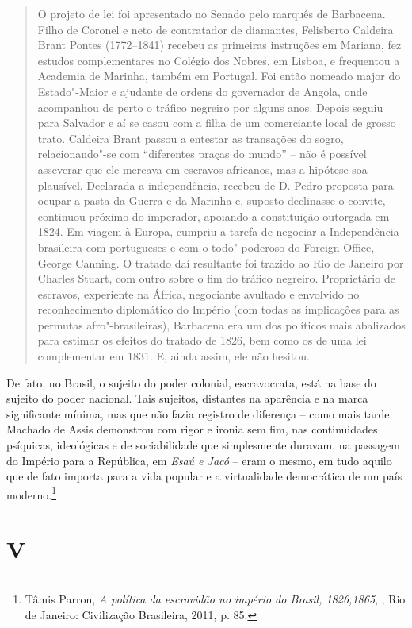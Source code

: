 \begin{quote}
O projeto de lei foi apresentado no Senado pelo marquês de Barbacena.
Filho de Coronel e neto de contratador de diamantes, Felisberto Caldeira
Brant Pontes (1772--1841) recebeu as primeiras instruções em Mariana, fez
estudos complementares no Colégio dos Nobres, em Lisboa, e frequentou a
Academia de Marinha, também em Portugal. Foi então nomeado major do
Estado"-Maior e ajudante de ordens do governador de Angola, onde
acompanhou de perto o tráfico negreiro por alguns anos. Depois seguiu
para Salvador e aí se casou com a filha de um comerciante local de
grosso trato. Caldeira Brant passou a entestar as transações do sogro,
relacionando"-se com ``diferentes praças do mundo'' -- não é possível
asseverar que ele mercava em escravos africanos, mas a hipótese soa
plausível. Declarada a independência, recebeu de D. Pedro  proposta
para ocupar a pasta da Guerra e da Marinha e, suposto declinasse o
convite, continuou próximo do imperador, apoiando a constituição
outorgada em 1824. Em viagem à Europa, cumpriu a tarefa de negociar a
Independência brasileira com portugueses e com o todo"-poderoso do
Foreign Office, George Canning. O tratado daí resultante foi trazido ao
Rio de Janeiro por Charles Stuart, com outro sobre o fim do tráfico
negreiro. Proprietário de escravos, experiente na África, negociante
avultado e envolvido no reconhecimento diplomático do Império (com todas
as implicações para as permutas afro"-brasileiras), Barbacena era um dos
políticos mais abalizados para estimar os efeitos do tratado de 1826,
bem como os de uma lei complementar em 1831. E, ainda assim, ele não
hesitou.
\end{quote}

De fato, no Brasil, o sujeito do poder colonial, escravocrata, está na
base do sujeito do poder nacional. Tais sujeitos, distantes na aparência
e na marca significante mínima, mas que não fazia registro de diferença
-- como mais tarde Machado de Assis demonstrou com rigor e ironia sem
fim, nas continuidades psíquicas, ideológicas e de sociabilidade que
simplesmente duravam, na passagem do Império para a República, em
\emph{Esaú e Jacó} -- eram o mesmo, em tudo aquilo que de fato importa
para a vida popular e a virtualidade democrática de um país
moderno.\footnote{Tâmis Parron, \emph{A política da escravidão no
  império do Brasil, 1826,1865}, , Rio de Janeiro: Civilização
  Brasileira, 2011, p. 85.}

\section{V}

